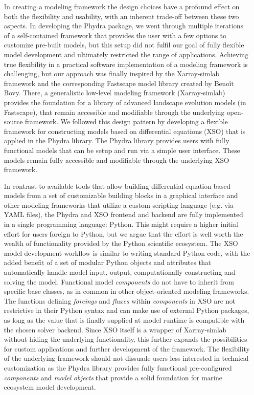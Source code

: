 \documentclass[journal abbreviation, manuscript]{copernicus}
\begin{document}
In creating a modeling framework the design choices have a profound effect on both the flexibility and usability, with an inherent trade-off between these two aspects. In developing the Phydra package, we went through multiple iterations of a self-contained framework that provides the user with a few options to customize pre-built models, but this setup did not fulfil our goal of fully flexible model development and ultimately restricted the range of applications. Achieving true flexibility in a practical software implementation of a modeling framework is challenging, but our approach was finally inspired by the Xarray-simlab framework and the corresponding Fastscape model library created by Benoît Bovy. There, a generalistic low-level modeling framework (Xarray-simlab) provides the foundation for a library of advanced landscape evolution models (in Fastscape), that remain accessible and modifiable through the underlying open-source framework. We followed this design pattern by developing a flexible framework for constructing models based on differential equations (XSO) that is applied in the Phydra library. The Phydra library provides users with fully functional models that can be setup and run via a simple user interface. These models remain fully accessible and modifiable through the underlying XSO framework.

In contrast to available tools that allow building differential equation based models from a set of customizable building blocks in a graphical interface and other modeling frameworks that utilize a custom scripting language (e.g. via YAML files), the Phydra and XSO frontend and backend are fully implemented in a single programming language: Python. This might require a higher initial effort for users foreign to Python, but we argue that the effort is well worth the wealth of functionality provided by the Python scientific ecosystem. The XSO model development workflow is similar to writing standard Python code, with the added benefit of a set of modular Python objects and attributes that automatically handle model input, output, computationally constructing and solving the model. Functional model \textit{components} do not have to inherit from specific base classes, as in common in other object-oriented modeling frameworks. The functions defining \textit{forcings} and \textit{fluxes} within \textit{components} in XSO are not restrictive in their Python syntax and can make use of external Python packages, as long as the value that is finally supplied at model runtime is compatible with the chosen solver backend. Since XSO itself is a wrapper of Xarray-simlab without hiding the underlying functionality, this further expands the possibilities for custom applications and further development of the framework. The flexibility of the underlying framework should not dissuade users less interested in technical customization as the Phydra library provides fully functional pre-configured \textit{components} and \textit{model objects} that provide a solid foundation for marine ecosystem model development.
\end{document}
